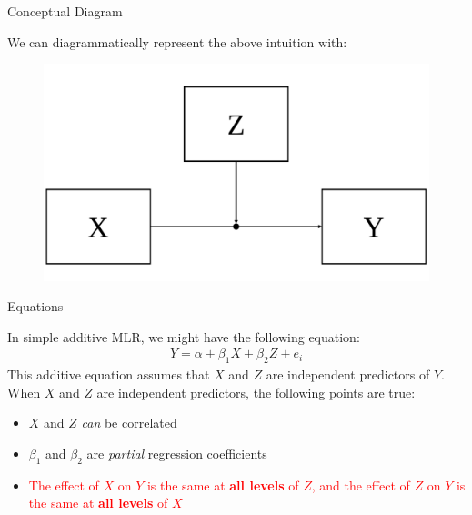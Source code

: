 \documentclass{beamer}
\newcommand{\red}[0]{\textcolor{red}}
\newcommand{\va}[0]{\vspace{12pt}}
\newcommand{\vb}[0]{\vspace{6pt}}
\begin{document}
\begin{frame}{Conceptual Diagram}

  We can diagrammatically represent the above intuition with:

  \begin{figure}
    \includegraphics[width=\textwidth]{figures/modConcept.pdf}
  \end{figure}

\end{frame}



\begin{frame}{Equations}

  In simple additive MLR, we might have the following equation:
  \begin{align}
    Y = \alpha + \beta_1X + \beta_2Z + e_i \label{additiveEq}
  \end{align}
  This additive equation assumes that $X$ and $Z$ are independent
  predictors of $Y$.\\
  \va
  When $X$ and $Z$ are independent predictors, the following
  points are true:
  \vb
  \begin{itemize}
  \item $X$ and $Z$ \emph{can} be correlated
    \vb
  \item $\beta_1$ and $\beta_2$ are \emph{partial} regression
    coefficients
    \vb
  \item \red{The effect of $X$ on $Y$ is the same at \textbf{all levels} of
    $Z$, and the effect of $Z$ on $Y$ is the same at \textbf{all
      levels} of $X$}
  \end{itemize}

\end{frame}
\end{document}
